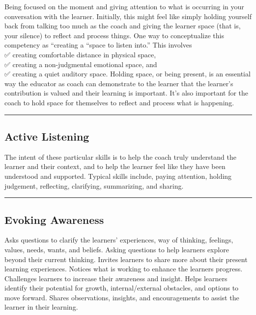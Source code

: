 \documentclass[
]{book}
\begin{document}
Being focused on the moment and giving attention to what is occurring in your conversation with the learner. Initially, this might feel like simply holding yourself back from talking too much as the coach and giving the learner space (that is, your silence) to reflect and process things. One way to conceptualize this competency as ``creating a ``space to listen into.'' This involves\\
✅ creating comfortable distance in physical space,\\
✅ creating a non-judgmental emotional space, and\\
✅ creating a quiet auditory space. Holding space, or being present, is an essential way the educator as coach can demonstrate to the learner that the learner's contribution is valued and their learning is important. It's also important for the coach to hold space for themselves to reflect and process what is happening.

\begin{center}\rule{0.5\linewidth}{0.5pt}\end{center}

\hypertarget{active-listening}{%
\subsection*{Active Listening}\label{active-listening}}

The intent of these particular skills is to help the coach truly understand the learner and their context, and to help the learner feel like they have been understood and supported. Typical skills include, paying attention, holding judgement, reflecting, clarifying, summarizing, and sharing.

\begin{center}\rule{0.5\linewidth}{0.5pt}\end{center}

\hypertarget{evoking-awareness}{%
\subsection*{Evoking Awareness}\label{evoking-awareness}}

Asks questions to clarify the learners' experiences, way of thinking, feelings, values, needs, wants, and beliefs. Asking questions to help learners explore beyond their current thinking. Invites learners to share more about their present learning experiences. Notices what is working to enhance the learners progress. Challenges learners to increase their awareness and insight. Helps learners identify their potential for growth, internal/external obstacles, and options to move forward. Shares observations, insights, and encouragements to assist the learner in their learning.
\end{document}
